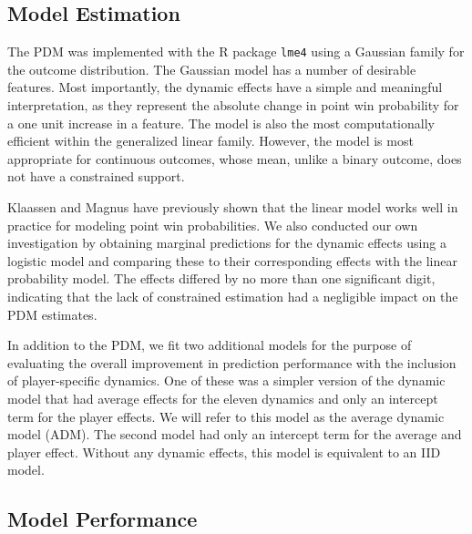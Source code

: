 \documentclass{Latex/svjour3}
\begin{document}


\subsection{Model Estimation}

The PDM was implemented with the R package \texttt{lme4} using a Gaussian family
for the outcome distribution. The Gaussian model has a number of desirable
features. Most importantly, the dynamic effects have a simple and meaningful
interpretation, as they represent the absolute change in point win probability
for a one unit increase in a feature. The model is also the most computationally
efficient within the generalized linear family. However, the model is most
appropriate for continuous outcomes, whose mean, unlike a binary outcome, does
not have a constrained support.

Klaassen and Magnus have previously shown  that the linear model works well in practice for
modeling point win probabilities. We also conducted our own investigation by
obtaining marginal predictions for the dynamic effects using a logistic model
and comparing these to their corresponding effects with the linear probability
model. The effects differed by no more than one significant digit, indicating
that the lack of constrained estimation had a negligible impact on the PDM
estimates.

In addition to the PDM, we fit two additional models for the purpose of
evaluating the overall improvement in prediction performance with the inclusion
of player-specific dynamics. One of these was a simpler version of the dynamic
model that had average effects for the eleven dynamics and only an intercept
term for the player effects. We will refer to this model as the average dynamic
model (ADM). The second model had only an intercept term for the average and
player effect. Without any dynamic effects, this model is equivalent to an IID
model.

\subsection{Model Performance}
\end{document}
